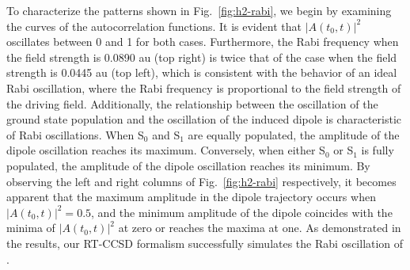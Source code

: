 To characterize the patterns shown in Fig.~\ref{fig:h2-rabi}, we begin by examining the curves of the autocorrelation functions. It is evident that $|A(t_{0}, t)|^{2}$ oscillates between 0 and 1 for both cases. Furthermore, the Rabi frequency when the field strength is 0.0890 au (top right) is twice that of the case when the field strength is 0.0445 au (top left), which is consistent with the behavior of an ideal Rabi oscillation, where the Rabi frequency is proportional to the field strength of the driving field. Additionally, the relationship between the oscillation of the ground state population and the oscillation of the induced dipole is characteristic of Rabi oscillations. When S$_{0}$ and S$_{1}$ are equally populated, the amplitude of the dipole oscillation reaches its maximum. Conversely, when either S$_{0}$ or S$_{1}$ is fully populated, the amplitude of the dipole oscillation reaches its minimum. By observing the left and right columns of Fig.~\ref{fig:h2-rabi} respectively, it becomes apparent that the maximum amplitude in the dipole trajectory occurs when $|A(t_{0}, t)|^{2}=0.5$, and the minimum amplitude of the dipole coincides with the minima of $|A(t_{0}, t)|^{2}$ at zero or reaches the maxima at one. As demonstrated in the results, our RT-CCSD formalism successfully simulates the Rabi oscillation of .

